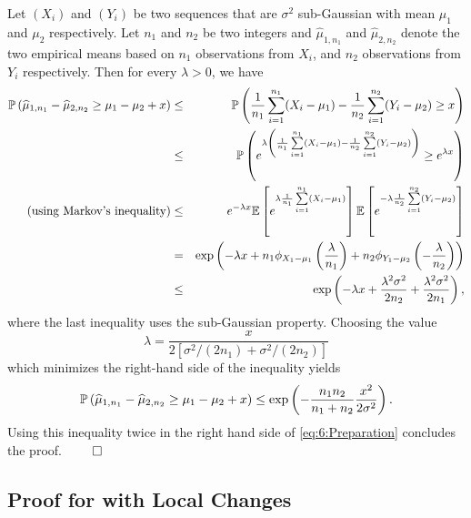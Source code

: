 Let $(X_i)$ and $(Y_i)$ be two \iid{} sequences that are $\sigma^2$ sub-Gaussian with mean $\mu_1$ and $\mu_2$ respectively. Let $n_1$ and $n_2$ be two integers and $\widehat{\mu}_{1,n_1}$ and $\widehat{\mu}_{2,n_2}$ denote the two empirical means based on $n_1$ observations from $X_i$, and $n_2$ observations from $Y_i$ respectively.
Then for every $\lambda > 0$, we have
\begin{eqnarray*}
    \mathbb{P}\left(\widehat{\mu}_{1,n_1} - \widehat{\mu}_{2,n_2} \geq \mu_1 - \mu_2 + x \right) & \leq & \mathbb{P}\left(\frac{1}{n_1}\sum_{i=1}^{n_1} (X_i-\mu_1) - \frac{1}{n_2}\sum_{i=1}^{n_2} (Y_i - \mu_2) \geq x \right)\\
    & \leq & \mathbb{P}\left(e^{\lambda \left(\frac{1}{n_1}\sum\limits_{i=1}^{n_1} (X_i-\mu_1) - \frac{1}{n_2}\sum\limits_{i=1}^{n_2} (Y_i - \mu_2)\right)} \geq e^{\lambda x} \right) \\
    \text{(using Markov's inequality)}
    & \leq & e^{-\lambda x}\mathbb{E}\left[e^{\lambda \frac{1}{n_1}\sum\limits_{i=1}^{n_1} (X_i-\mu_1)}\right]\mathbb{E}\left[e^{-\lambda \frac{1}{n_2}\sum\limits_{i=1}^{n_2} (Y_i-\mu_2)}\right] \\
    & = & \exp\left(- \lambda x + n_1\phi_{X_1 - \mu_1}\left(\frac{\lambda}{n_1}\right) + n_2\phi_{Y_1 - \mu_2}\left(-\frac{\lambda}{n_2}\right)\right) \\
    & \leq & \exp\left(- \lambda x + \frac{\lambda^2\sigma^2}{2n_2} + \frac{\lambda^2\sigma^2}{2n_1}\right),
\end{eqnarray*}
%
where the last inequality uses the sub-Gaussian property.
%
Choosing the value
\[\lambda = \frac{x}{2\left[\sigma^2/(2n_1) + \sigma^2/(2n_2)\right]}\]
which minimizes the right-hand side of the inequality yields
\[\mathbb{P}\left(\widehat{\mu}_{1,n_1} - \widehat{\mu}_{2,n_2} \geq \mu_1 - \mu_2 + x \right) \leq \exp\left(- \frac{n_1n_2}{n_1+n_2}\frac{x^2}{2\sigma^2}\right).\]
%
Using this inequality twice in the right hand side of \eqref{eq:6:Preparation} concludes the proof.
\hfill{} $\qed$  %


\subsection{Proof for \GLRklUCB{} with Local Changes}
\label{proof:6:mainRegretBound}

